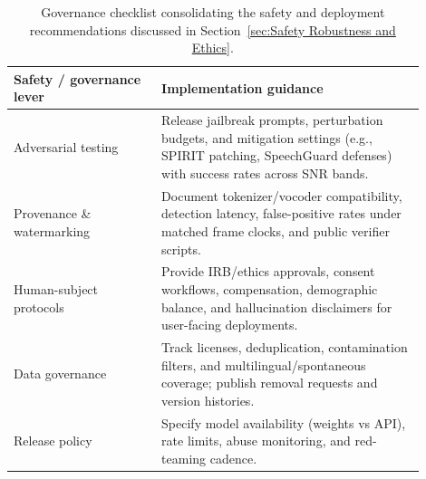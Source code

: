 \begin{table}[ht]
    \centering
    \small
    \renewcommand{\arraystretch}{1.2}
    \begin{tabular}{p{0.32\linewidth} p{0.58\linewidth}}
        \toprule
        \textbf{Safety / governance lever} & \textbf{Implementation guidance} \\
        \midrule
        Adversarial testing & Release jailbreak prompts, perturbation budgets, and mitigation settings (e.g., SPIRIT patching, SpeechGuard defenses) with success rates across SNR bands. \\
        Provenance \& watermarking & Document tokenizer/vocoder compatibility, detection latency, false-positive rates under matched frame clocks, and public verifier scripts. \\
        Human-subject protocols & Provide IRB/ethics approvals, consent workflows, compensation, demographic balance, and hallucination disclaimers for user-facing deployments. \\
        Data governance & Track licenses, deduplication, contamination filters, and multilingual/spontaneous coverage; publish removal requests and version histories. \\
        Release policy & Specify model availability (weights vs API), rate limits, abuse monitoring, and red-teaming cadence. \\
        \bottomrule
    \end{tabular}
    \caption{Governance checklist consolidating the safety and deployment recommendations discussed in Section~\ref{sec:Safety Robustness and Ethics}.}
    \label{tab:safety_governance}
\end{table}
